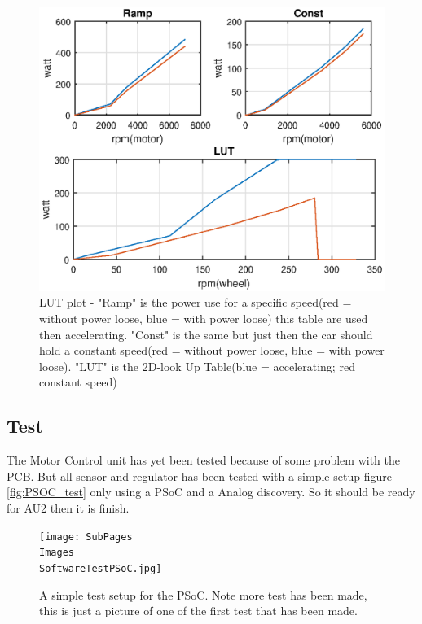 \begin{figure}[H]
	\centering
	\includegraphics [width=6in]{../Documentation_AU2/Software/Pictures/LUT.eps}
	\caption{LUT plot - "Ramp" is the power use for a specific speed(red = without power loose, blue = with power loose) this table are used then accelerating. "Const" is the same but just then the car should hold a constant speed(red = without power loose, blue = with power loose). "LUT" is the 2D-look Up Table(blue = accelerating; red constant speed)}
	\label{fig:LUT_plot}
\end{figure}


\subsection{Test}

The Motor Control unit has yet been tested because of some problem with the PCB. But all sensor and regulator has been tested with a simple setup figure \vref{fig:PSOC_test} only using a PSoC and a Analog discovery. So it should be ready for AU2 then it is finish.

\begin{figure}[H]
	\centering
	\texttt{[image: SubPages\\Images\\SoftwareTestPSoC.jpg]}
	\caption{A simple test setup for the PSoC. Note more test has been made, this is just a picture of one of the first test that has been made.}
	\label{fig:PSOC_test}
\end{figure}

